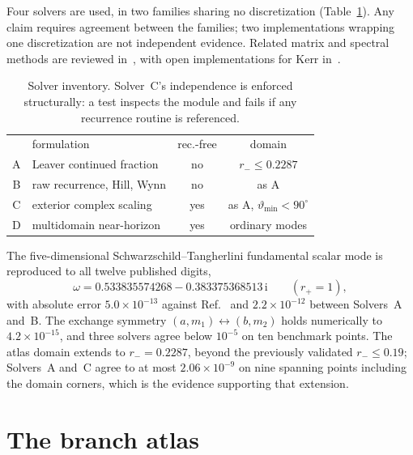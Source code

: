 \documentclass[aps,prd,reprint,superscriptaddress,nofootinbib,longbibliography]{revtex4-2}
\theoremstyle{plain}
\theoremstyle{definition}
\theoremstyle{remark}
\newcommand{\ii}{\mathrm{i}}
\begin{document}
Four solvers are used, in two families sharing no discretization
(Table~\ref{tab:solvers}). Any claim requires agreement between the families;
two implementations wrapping one discretization are not independent evidence.
Related matrix and spectral methods are reviewed
in~\cite{Hatsuda2021D49,Choetal2011D57,Lin2016D58,Linetal2017D59,%
Matyjasek2017D60,Fortuna2020D62}, with open implementations for Kerr
in~\cite{Stein2019D61}.

\begin{table}[b]
\centering
\begin{ruledtabular}
\begin{tabular}{clcc}
& formulation & rec.-free & domain \\
\colrule
A & Leaver continued fraction & no & $r_-\le0.2287$ \\
B & raw recurrence, Hill, Wynn & no & as A \\
C & exterior complex scaling & yes & as A, $\vartheta_{\min}<90^\circ$ \\
D & multidomain near-horizon & yes & ordinary modes \\
\end{tabular}
\end{ruledtabular}
\caption{Solver inventory. Solver~C's independence is enforced structurally: a
test inspects the module and fails if any recurrence routine is referenced.}
\label{tab:solvers}
\end{table}

The five-dimensional Schwarzschild--Tangherlini fundamental scalar mode is
reproduced to all twelve published digits,
\begin{equation}\label{eq:st5d}
  \omega = 0.533835574268-0.383375368513\,\ii\qquad(r_+=1),
\end{equation}
with absolute error $5.0\times10^{-13}$ against Ref.~\cite{Matyjasek2021} and
$2.2\times10^{-12}$ between Solvers~A and~B. The exchange symmetry
$(a,m_1)\leftrightarrow(b,m_2)$ holds numerically to $4.2\times10^{-15}$, and
three solvers agree below $10^{-5}$ on ten benchmark points. The atlas domain
extends to $r_-=0.2287$, beyond the previously validated $r_-\le0.19$; Solvers~A
and~C agree to at most $2.06\times10^{-9}$ on nine spanning points including the
domain corners, which is the evidence supporting that extension.

\section{The branch atlas}\label{sec:atlas}
\end{document}
